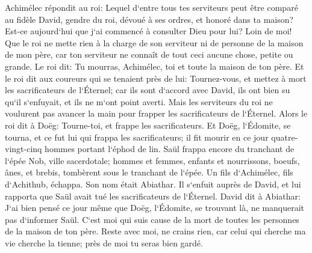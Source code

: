 \verse Achimélec répondit au roi: Lequel d`entre tous tes serviteurs peut être comparé au fidèle David, gendre du roi, dévoué à ses ordres, et honoré dans ta maison? 
\verse Est-ce aujourd`hui que j`ai commencé à consulter Dieu pour lui? Loin de moi! Que le roi ne mette rien à la charge de son serviteur ni de personne de la maison de mon père, car ton serviteur ne connaît de tout ceci aucune chose, petite ou grande. 
\verse Le roi dit: Tu mourras, Achimélec, toi et toute la maison de ton père. 
\verse Et le roi dit aux coureurs qui se tenaient près de lui: Tournez-vous, et mettez à mort les sacrificateurs de l`Éternel; car ils sont d`accord avec David, ils ont bien su qu`il s`enfuyait, et ils ne m`ont point averti. Mais les serviteurs du roi ne voulurent pas avancer la main pour frapper les sacrificateurs de l`Éternel. 
\verse Alors le roi dit à Doëg: Tourne-toi, et frappe les sacrificateurs. Et Doëg, l`Édomite, se tourna, et ce fut lui qui frappa les sacrificateurs; il fit mourir en ce jour quatre-vingt-cinq hommes portant l`éphod de lin. 
\verse Saül frappa encore du tranchant de l`épée Nob, ville sacerdotale; hommes et femmes, enfants et nourrissons, boeufs, ânes, et brebis, tombèrent sous le tranchant de l`épée. 
\verse Un fils d`Achimélec, fils d`Achithub, échappa. Son nom était Abiathar. Il s`enfuit auprès de David, 
\verse et lui rapporta que Saül avait tué les sacrificateurs de l`Éternel. 
\verse David dit à Abiathar: J`ai bien pensé ce jour même que Doëg, l`Édomite, se trouvant là, ne manquerait pas d`informer Saül. C`est moi qui suis cause de la mort de toutes les personnes de la maison de ton père. 
\verse Reste avec moi, ne crains rien, car celui qui cherche ma vie cherche la tienne; près de moi tu seras bien gardé. 

